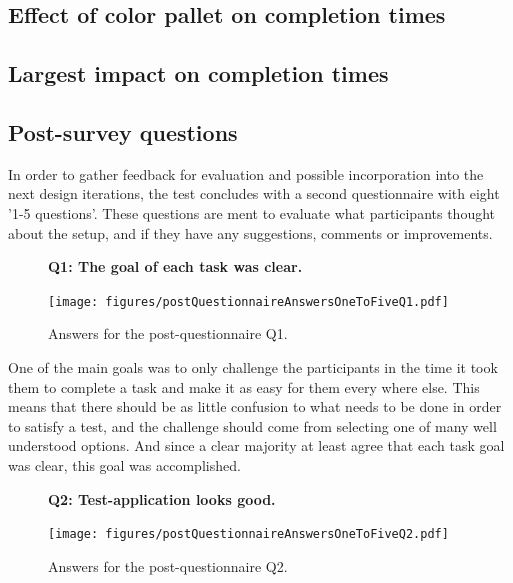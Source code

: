 \documentclass[nofilelist,dvipsnames]{cslthse-msc}
\begin{document}
			\subsection{Effect of color pallet on completion times}


			\subsection{Largest impact on completion times}


			\subsection{Post-survey questions}

        In order to gather feedback for evaluation and possible incorporation
        into the next design iterations, the test concludes with a second
        questionnaire with eight '1-5 questions'. These questions are ment to
        evaluate what participants thought about the setup, and if they have
        any suggestions, comments or improvements.

				\begin{figure}[h!]
          \textbf{Q1: The goal of each task was clear.}
          \begin{center}
            \texttt{[image: figures/postQuestionnaireAnswersOneToFiveQ1.pdf]}
            \vspace{-1cm}
            \caption{Answers for the post-questionnaire Q1.}
          \end{center}
				\end{figure}

        One of the main goals was to only challenge the participants in the
        time it took them to complete a task and make it as easy for them every
        where else. This means that there should be as little confusion to what
        needs to be done in order to satisfy a test, and the challenge should
        come from selecting one of many well understood options. And since a
        clear majority at least agree that each task goal was clear, this goal
        was accomplished.

				\begin{figure}[h!]
          \textbf{Q2: Test-application looks good.}
          \begin{center}
            \texttt{[image: figures/postQuestionnaireAnswersOneToFiveQ2.pdf]}
            \vspace{-1cm}
            \caption{Answers for the post-questionnaire Q2.}
          \end{center}
				\end{figure}
\end{document}
